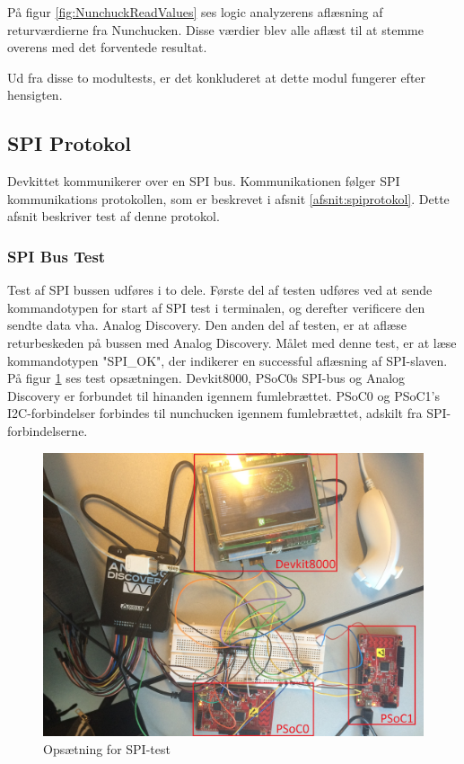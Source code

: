 \noindent På figur \ref{fig:NunchuckReadValues} ses logic analyzerens aflæsning af returværdierne fra Nunchucken. Disse værdier blev alle aflæst til at stemme overens med det forventede resultat.\newline

\noindent Ud fra disse to modultests, er det konkluderet at dette modul fungerer efter hensigten. \newline 

\subsection{SPI Protokol}
Devkittet kommunikerer over en SPI bus. Kommunikationen følger SPI kommunikations protokollen, som er beskrevet i afsnit \ref{afsnit:spiprotokol}. Dette afsnit beskriver test af denne protokol.

\subsubsection{SPI Bus Test}
Test af SPI bussen udføres i to dele. Første del af testen udføres ved at sende kommandotypen for start af SPI test i terminalen, og derefter verificere den sendte data vha. Analog Discovery. Den anden del af testen, er at aflæse returbeskeden på bussen med Analog Discovery. Målet med denne test, er at læse kommandotypen "SPI\_OK", der indikerer en successful aflæsning af SPI-slaven.  På figur \ref{figure:SpiTestSetup} ses test opsætningen. Devkit8000, PSoC0s SPI-bus og Analog Discovery  er forbundet til hinanden igennem fumlebrættet. PSoC0 og PSoC1's I2C-forbindelser forbindes til nunchucken igennem fumlebrættet, adskilt fra SPI-forbindelserne.


\begin{figure}[H]
	\centering
	\includegraphics[width=\textwidth]{Test/images/SPItest/SpiTestSetup}
	\caption{Opsætning for SPI-test}
	\label{figure:SpiTestSetup}
\end{figure}


